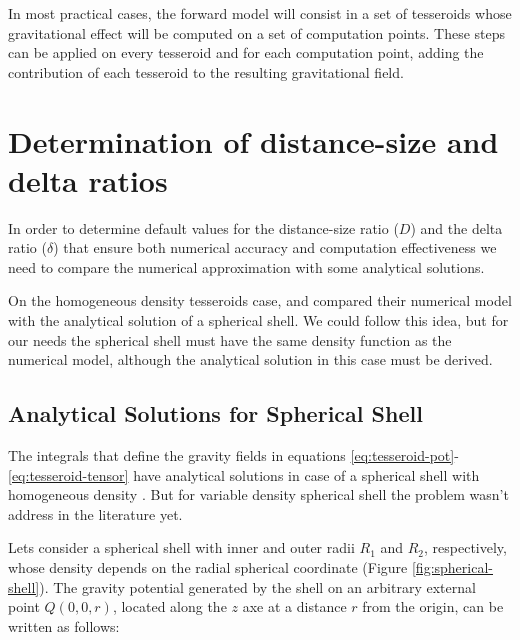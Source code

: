 \documentclass[extra]{gji}
\begin{document}
In most practical cases, the forward model will consist in a set of 
tesseroids whose gravitational effect will be computed on a set of 
computation points.
These steps can be applied on every tesseroid and for each computation point,
adding the contribution of each tesseroid to the resulting 
gravitational field.



\section{Determination of distance-size and delta ratios}

In order to determine default values for the distance-size ratio ($D$)
and the delta ratio ($\delta$) that ensure both numerical accuracy and 
computation effectiveness we need to compare the numerical 
approximation with some analytical solutions.

On the homogeneous density tesseroids case, \citet{Uieda2016} and 
\citet{Grombein2013} compared their numerical model with the analytical 
solution of a spherical shell.
We could follow this idea, but for our needs the spherical shell must 
have the same density function as the numerical model, although the 
analytical solution in this case must be derived.


\subsection{Analytical Solutions for Spherical Shell}

The integrals that define the gravity fields in equations 
\ref{eq:tesseroid-pot}-\ref{eq:tesseroid-tensor} have analytical 
solutions in case of a spherical shell with homogeneous density 
\citep{Mikuska2006,Grombein2013}.
But for variable density spherical shell the problem wasn't address in 
the literature yet.

Lets consider a spherical shell with inner and outer radii $R_1$ and 
$R_2$, respectively, whose density depends on the radial spherical 
coordinate (Figure \ref{fig:spherical-shell}).
The gravity potential generated by the shell on an arbitrary external 
point $Q(0,0,r)$, located along the $z$ axe at a distance $r$ from the 
origin, can be written as follows:
\end{document}
